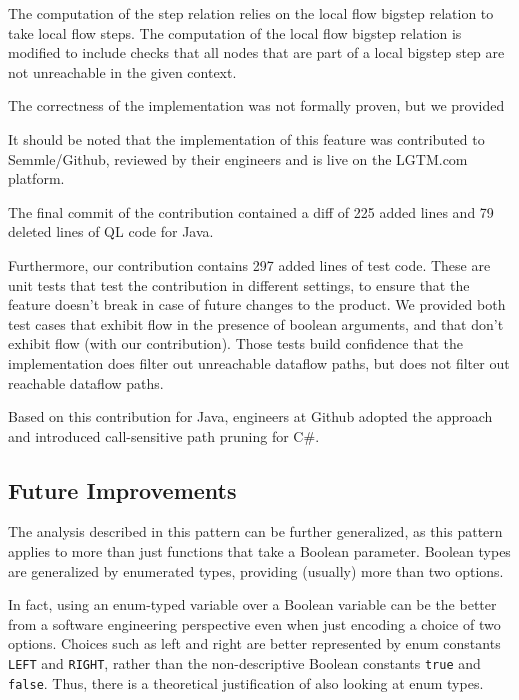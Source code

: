 The computation of the step relation relies on the local flow bigstep relation
to take local flow steps.
The computation of the local flow bigstep relation is modified to include checks 
that all nodes that are part of a local bigstep step are not unreachable in the 
given context.

The correctness of the implementation was not formally proven, but we provided 

It should be noted that the implementation of this feature was contributed to Semmle/Github,
reviewed by their engineers and is live on the LGTM.com platform.

The final commit of the contribution contained a diff of 225 added lines and 
79 deleted lines of QL code for Java.

Furthermore, our contribution contains 297 added lines of test code.
These are unit tests that test the contribution in different settings, to ensure 
that the feature doesn't break in case of future changes to the product.
We provided both test cases that exhibit flow in the presence of boolean 
arguments, and that don't exhibit flow (with our contribution).
Those tests build confidence that the implementation does filter out unreachable 
dataflow paths, but does not filter out reachable dataflow paths.

Based on this contribution for Java, engineers at Github adopted 
the approach and introduced call-sensitive path pruning for C\#.

\subsection{Future Improvements}
The analysis described in this pattern can be further generalized, as
this pattern applies to more than just functions that take a Boolean parameter.
Boolean types are generalized by enumerated types, providing (usually) more than two options.

In fact, using an enum-typed variable over a Boolean variable can be the better
 from a software engineering perspective
even when just encoding a choice of two options.
Choices such as left and right are better represented 
by enum constants \texttt{LEFT} and \texttt{RIGHT}, rather than the 
non-descriptive Boolean constants \texttt{true} and \texttt{false}.
Thus, there is a theoretical justification of also looking at enum types.

